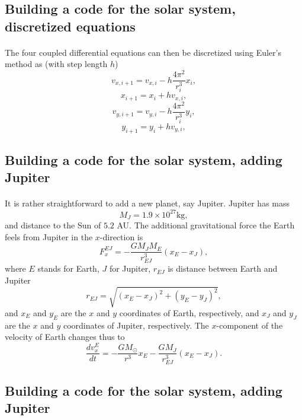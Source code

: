 \documentclass[%
oneside,                 %
final,                   %
10pt]{article}
\begin{document}
\subsection*{Building a code for the solar system, discretized equations}

\paragraph{}
The four coupled differential equations can then be discretized using Euler's method as (with step length $h$)
\[
   v_{x,i+1}=v_{x,i}-h\frac{4\pi^2}{r_i^3}x_i,
\]
\[
   x_{i+1}=x_i+hv_{x,i},
\]
\[
   v_{y,i+1}=v_{y,i}-h\frac{4\pi^2}{r_i^3}y_i,
\]
\[
   y_{i+1}=y_i+hv_{y,i},
\]




\subsection*{Building a code for the solar system, adding Jupiter}

\paragraph{}
It is rather straightforward to add a new planet, say Jupiter.
Jupiter has mass
\[
M_J=1.9\times 10^{27}\mathrm{kg},
\]
and distance to the Sun of $5.2$ AU. 
The additional gravitational force the Earth feels from Jupiter in the $x$-direction is
  \[
   F_{x}^{EJ}=-\frac{GM_JM_E}{r_{EJ}^3}(x_E-x_J),
  \]
where $E$ stands for Earth, $J$ for Jupiter, $r_{EJ}$ is distance between Earth and Jupiter
\[
r_{EJ} = \sqrt{(x_E-x_J)^2+(y_E-y_J)^2},
\]
and $x_E$ and $y_E$ are the $x$ and $y$ coordinates of Earth, respectively, and 
$x_J$ and $y_J$ are the $x$ and $y$ coordinates of Jupiter, respectively.
The $x$-component of the velocity of Earth changes thus to
\[
   \frac{dv_x^E}{dt}=-\frac{GM_{\odot}}{r^3}x_E-\frac{GM_J}{r_{EJ}^3}(x_E-x_J).
\]




\subsection*{Building a code for the solar system, adding Jupiter}

\end{document}
